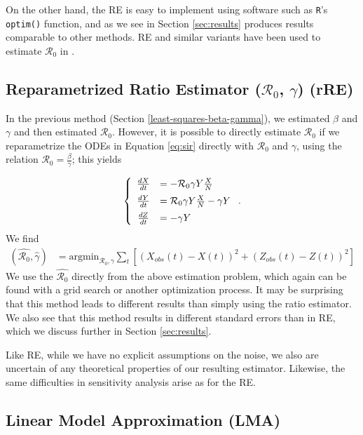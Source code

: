 \documentclass[12pt]{article}
\newcommand{\rr}{\ensuremath{\mathcal{R}_0}}
\begin{document}
On the other hand, the RE is easy to implement using software such as \texttt{R}'s \texttt{optim()} function, and as we see in Section \ref{sec:results} produces results comparable to other methods.  RE and similar variants have been used to estimate $\rr$ in \cite{majumder2016}.

\subsection{Reparametrized Ratio Estimator ($\rr$, $\gamma$) (rRE)}\label{reparametrized-least-squares-rux5f0-gamma}

In the previous method (Section \ref{least-squares-beta-gamma}), we estimated $\beta$ and $\gamma$ and then estimated $\rr$.  However, it is possible to directly estimate $\rr$ if we reparametrize the ODEs in Equation \eqref{eq:sir} directly with \(\rr\) and \(\gamma\), using the relation $\rr = \frac{\beta}{\gamma}$; this yields

\begin{align*}
  \left \{
  \begin{array}{cl}
    \frac{dX}{dt} &= - \rr \gamma Y \frac{X}{N}\vspace{.5em}\\
    \frac{dY}{dt} &=  \rr \gamma Y \frac{X}{N}  - \gamma Y\vspace{.5em} \\
    \frac{dZ}{dt} &=  - \gamma Y 
  \end{array}
  \right . .
  \end{align*}
We find
\begin{align*}
(\hat{\rr}, \hat{\gamma} ) &= \text{argmin}_{\rr, \gamma} \sum_{t} \left [ \left (X_{obs}(t) - X(t)\right )^2 + \left ( Z_{obs}(t) - Z(t) \right )^2 \right ]
\end{align*}
We use the $\hat{\rr}$ directly from the above estimation problem, which again can be found with a grid search or another optimization process.  It may be surprising that this method leads to different results than simply using the ratio estimator.  We also see that this method results in different standard errors than in RE, which we discuss further in Section \ref{sec:results}.

Like RE, while we have no explicit assumptions on the noise, we also are uncertain of any theoretical properties of our resulting estimator.  Likewise, the same difficulties in sensitivity analysis arise as for the RE.



\subsection{Linear Model Approximation (LMA)}\label{linear-model-approximation-degree-10}
\end{document}
